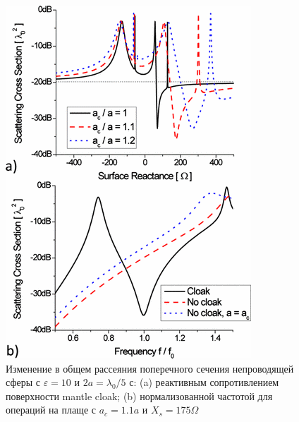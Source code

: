 \documentclass[12pt,a4paper]{article}
\begin{document}
\begin{figure}[t]
  \centering
  \includegraphics[height=0.3\paperheight, width=0.4\paperwidth]{2.png}
  \caption{Изменение в общем рассеяния поперечного сечения непроводящей сферы с $\varepsilon
  =10$ и $2a=\lambda_0/5$ с: (a) реактивным сопротивлением поверхности mantle cloak; (b)
  нормализованной частотой для операций на плаще с $a_c=1.1a$ и $X_s=175\Omega$}
  \label{fig:2}
\end{figure}
\end{document}
